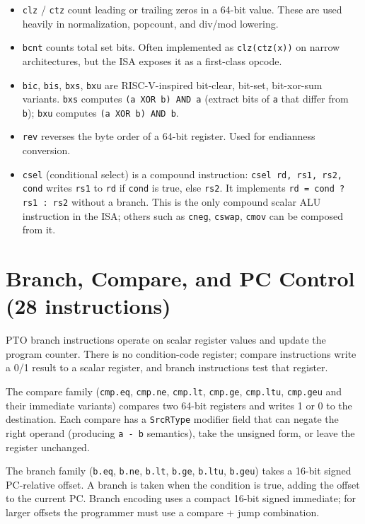 \begin{itemize}
  \item \texttt{clz} / \texttt{ctz} count leading or trailing zeros in a 64-bit value. These are used heavily in normalization, popcount, and div/mod lowering.
  \item \texttt{bcnt} counts total set bits. Often implemented as \texttt{clz(ctz(x))} on narrow architectures, but the ISA exposes it as a first-class opcode.
  \item \texttt{bic}, \texttt{bis}, \texttt{bxs}, \texttt{bxu} are RISC-V-inspired bit-clear, bit-set, bit-xor-sum variants. \texttt{bxs} computes \texttt{(a XOR b) AND a} (extract bits of \texttt{a} that differ from \texttt{b}); \texttt{bxu} computes \texttt{(a XOR b) AND b}.
  \item \texttt{rev} reverses the byte order of a 64-bit register. Used for endianness conversion.
  \item \texttt{csel} (conditional select) is a compound instruction: \texttt{csel rd, rs1, rs2, cond} writes \texttt{rs1} to \texttt{rd} if \texttt{cond} is true, else \texttt{rs2}. It implements \texttt{rd = cond ? rs1 : rs2} without a branch. This is the only compound scalar ALU instruction in the ISA; others such as \texttt{cneg}, \texttt{cswap}, \texttt{cmov} can be composed from it.
\end{itemize}

\section{Branch, Compare, and PC Control (28 instructions)}
PTO branch instructions operate on scalar register values and update the program counter. There is no condition-code register; compare instructions write a 0/1 result to a scalar register, and branch instructions test that register.

The compare family (\texttt{cmp.eq}, \texttt{cmp.ne}, \texttt{cmp.lt}, \texttt{cmp.ge}, \texttt{cmp.ltu}, \texttt{cmp.geu} and their immediate variants) compares two 64-bit registers and writes 1 or 0 to the destination. Each compare has a \texttt{SrcRType} modifier field that can negate the right operand (producing \texttt{a - b} semantics), take the unsigned form, or leave the register unchanged.

The branch family (\texttt{b.eq}, \texttt{b.ne}, \texttt{b.lt}, \texttt{b.ge}, \texttt{b.ltu}, \texttt{b.geu}) takes a 16-bit signed PC-relative offset. A branch is taken when the condition is true, adding the offset to the current PC. Branch encoding uses a compact 16-bit signed immediate; for larger offsets the programmer must use a compare + jump combination.

